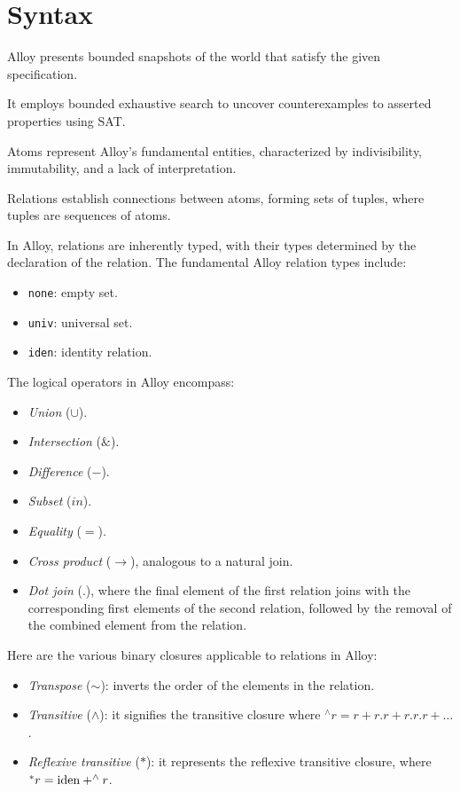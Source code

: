 \section{Syntax}

Alloy presents bounded snapshots of the world that satisfy the given specification. 

It employs bounded exhaustive search to uncover counterexamples to asserted properties using SAT.        
\newpage
\begin{definition}
    Atoms represent Alloy's fundamental entities, characterized by indivisibility, immutability, and a lack of interpretation.
\end{definition}
\begin{definition}
    Relations establish connections between atoms, forming sets of tuples, where tuples are sequences of atoms.
\end{definition}
In Alloy, relations are inherently typed, with their types determined by the declaration of the relation. 
The fundamental Alloy relation types include:
\begin{itemize}
    \item \texttt{none}: empty set. 
    \item \texttt{univ}: universal set.
    \item \texttt{iden}: identity relation.
\end{itemize}
The logical operators in Alloy encompass:
\begin{itemize}
    \item \textit{Union} ($\cup$).
    \item \textit{Intersection} ($\&$).
    \item \textit{Difference} ($-$).
    \item \textit{Subset} ($in$).
    \item \textit{Equality} ($=$).
    \item \textit{Cross product} ($\rightarrow$), analogous to a natural join.
    \item \textit{Dot join} ($.$), where the final element of the first relation joins with the corresponding first elements of the second relation, followed by the removal of the combined element from the relation.
\end{itemize}
Here are the various binary closures applicable to relations in Alloy:
\begin{itemize}
    \item \textit{Transpose} ($\sim$): inverts the order of the elements in the relation.
    \item \textit{Transitive} ($\land$): it signifies the transitive closure where $^{\land}r=r+r.r+r.r.r+\dots$. 
    \item \textit{Reflexive transitive} ($*$): it represents the reflexive transitive closure, where $^{*}r=\textnormal{iden}+^{\land}r$. 
\end{itemize}
